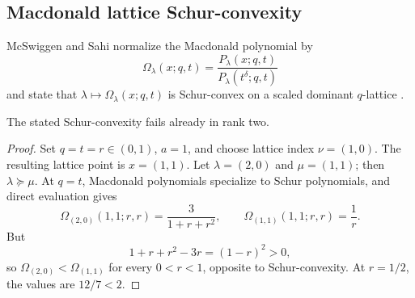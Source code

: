 \subsection{Macdonald lattice Schur-convexity}

McSwiggen and Sahi normalize the Macdonald polynomial by
\[
\Omega_\lambda(x;q,t)=\frac{P_\lambda(x;q,t)}{P_\lambda(t^\delta;q,t)}
\]
and state that $\lambda\mapsto\Omega_\lambda(x;q,t)$ is Schur-convex on a scaled dominant $q$-lattice \cite{McSwiggenSahi2026}.

\begin{theorem}\label{thm:macdonald}
The stated Schur-convexity fails already in rank two.
\end{theorem}
\begin{proof}
Set $q=t=r\in(0,1)$, $a=1$, and choose lattice index $\nu=(1,0)$.  The resulting lattice point is $x=(1,1)$.  Let $\lambda=(2,0)$ and $\mu=(1,1)$; then $\lambda\succeq\mu$.  At $q=t$, Macdonald polynomials specialize to Schur polynomials, and direct evaluation gives
\[
\Omega_{(2,0)}(1,1;r,r)=\frac{3}{1+r+r^2},\qquad
\Omega_{(1,1)}(1,1;r,r)=\frac1r.
\]
But
\[
1+r+r^2-3r=(1-r)^2>0,
\]
so $\Omega_{(2,0)}<\Omega_{(1,1)}$ for every $0<r<1$, opposite to Schur-convexity.  At $r=1/2$, the values are $12/7<2$.
\end{proof}
